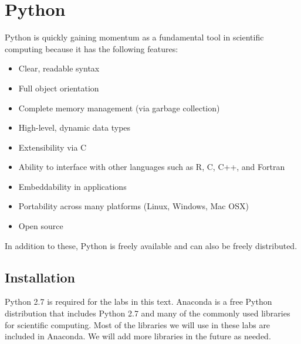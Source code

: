 \label{lab:Essential_Python}


\section*{Python} %
Python is quickly gaining momentum as a fundamental tool in scientific computing because it has the following features:
\begin{itemize}
\item Clear, readable syntax
\item Full object orientation
\item Complete memory management (via garbage collection)
\item High-level, dynamic data types
\item Extensibility via C
\item Ability to interface with other languages such as R, C, C++, and Fortran
\item Embeddability in applications
\item Portability across many platforms (Linux, Windows, Mac OSX)
\item Open source
\end{itemize}
In addition to these, Python is freely available and can also be freely distributed.

\subsection*{Installation} %
Python 2.7 is required for the labs in this text.
Anaconda is a free Python distribution that includes Python 2.7 and many of the commonly used libraries for scientific computing. 
Most of the libraries we will use in these labs are included in Anaconda.
We will add more libraries in the future as needed.

